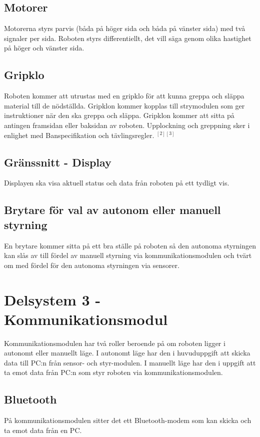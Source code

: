 \documentclass[11pt]{article}
\begin{document}
\begin{flushleft}
\subsection{Motorer}
Motorerna styrs parvis (båda på höger sida och båda på vänster sida) med två signaler per sida. Roboten styrs differentiellt, det vill säga genom olika hastighet på höger och vänster sida. 

\subsection{Gripklo}
Roboten kommer att utrustas med en gripklo för att kunna greppa och släppa material till de nödställda. Gripklon kommer kopplas till strymodulen som ger instruktioner när den ska greppa och släppa. Gripklon kommer att sitta på antingen framsidan eller baksidan av roboten. Upplockning och greppning sker i enlighet med Banspecifikation och tävlingsregler. $^{[2]}$$^{[3]}$

\subsection{Gränssnitt - Display}
Displayen ska visa aktuell status och data från roboten på ett tydligt vis.

\subsection{Brytare för val av autonom eller manuell styrning}
En brytare kommer sitta på ett bra ställe på roboten så den autonoma styrningen kan slås av till fördel av manuell styrning via kommunikationsmodulen och tvärt om med fördel för den autonoma styrningen via sensorer.

\section{Delsystem 3 - Kommunikationsmodul}
Kommunikationsmodulen har två roller beroende på om roboten ligger i autonomt eller manuellt läge. I autonomt läge har den i huvuduppgift att skicka data till PC:n från sensor- och styr-modulen. I manuellt läge har den i uppgift att ta emot data från PC:n som styr roboten via kommunikationsmodulen.

\subsection{Bluetooth}
På kommunikationsmodulen sitter det ett Bluetooth-modem som kan skicka och ta emot data från en PC.  


\end{flushleft}
\end{document}

